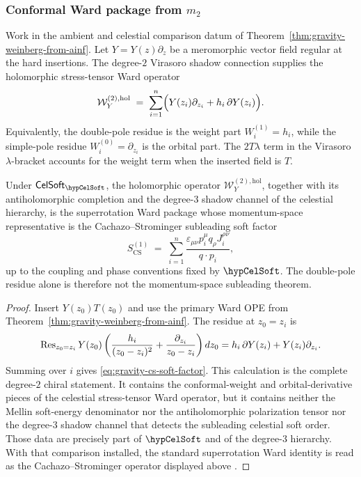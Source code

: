 \subsubsection*{Conformal Ward package from $m_2$}

\begin{theorem}
\label{thm:gravity-cs-from-ainf}
Work in the ambient and celestial comparison datum of
Theorem~\ref{thm:gravity-weinberg-from-ainf}.  Let
\(Y=Y(z)\partial_z\) be a meromorphic vector field regular at the hard
insertions.  The degree-$2$ Virasoro shadow connection supplies the
holomorphic stress-tensor Ward operator
\begin{equation}\label{eq:gravity-cs-soft-factor}
\mathcal W_Y^{(2),\mathrm{hol}}
\;=\;
\sum_{i=1}^{n}
\Bigl(
Y(z_i)\partial_{z_i}
+h_i\,\partial Y(z_i)
\Bigr).
\end{equation}
Equivalently, the double-pole residue is the weight part
\(W_i^{(1)}=h_i\), while the simple-pole residue
\(W_i^{(0)}=\partial_{z_i}\) is the orbital part.  The
\(2T\lambda\) term in the Virasoro \(\lambda\)-bracket accounts for
the weight term when the inserted field is \(T\).

Under \(\mathsf{CelSoft}_{\hypCelSoft}\), the holomorphic operator
\(\mathcal W_Y^{(2),\mathrm{hol}}\), together with its antiholomorphic
completion and the degree-$3$ shadow channel of the celestial
hierarchy, is the superrotation Ward package whose momentum-space
representative is the Cachazo--Strominger subleading soft factor
\[
S_{\mathrm{CS}}^{(1)}
\;=\;
\sum_{i=1}^{n}
\frac{\varepsilon_{\mu\nu}p_i^\mu q_\rho J_i^{\rho\nu}}
     {q\cdot p_i},
\]
up to the coupling and phase conventions fixed by \(\hypCelSoft\).
The double-pole residue alone is therefore not the momentum-space
subleading theorem.
\end{theorem}

\begin{proof}
Insert \(Y(z_0)T(z_0)\) and use the primary Ward OPE from
Theorem~\ref{thm:gravity-weinberg-from-ainf}.  The residue at
\(z_0=z_i\) is
\[
\operatorname{Res}_{z_0=z_i}Y(z_0)
\left(
\frac{h_i}{(z_0-z_i)^2}
+\frac{\partial_{z_i}}{z_0-z_i}
\right)dz_0
=h_i\,\partial Y(z_i)+Y(z_i)\partial_{z_i}.
\]
Summing over \(i\) gives
\eqref{eq:gravity-cs-soft-factor}.  This calculation is the complete
degree-$2$ chiral statement.  It contains the conformal-weight and
orbital-derivative pieces of the celestial stress-tensor Ward
operator, but it contains neither the Mellin soft-energy denominator
nor the antiholomorphic polarization tensor nor the degree-$3$
shadow channel that detects the subleading celestial soft order.
Those data are precisely part of \(\hypCelSoft\) and of the
degree-$3$ hierarchy.  With that comparison installed, the standard
superrotation Ward identity is read as the Cachazo--Strominger
operator displayed above
\cite{CachazoStrominger14,PateRaclariuStromingerYuan19,Strominger18}.
\end{proof}

